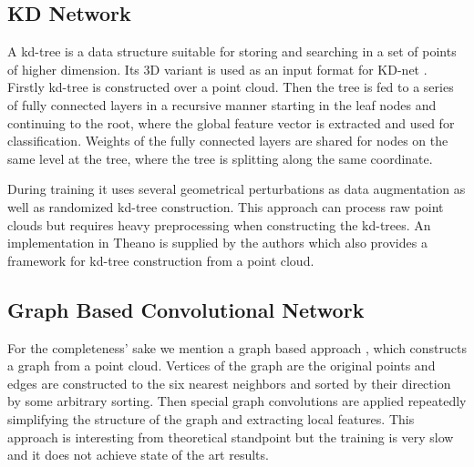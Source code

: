\subsection{KD Network}
A kd-tree \cite{bentley_multidimensional_1975} is a data structure suitable for storing and searching in a set of points of higher dimension. Its 3D variant is used as an input format for KD-net \cite{klokov_escape_2017}. Firstly kd-tree is constructed over a point cloud. Then the tree is fed to a series of fully connected layers in a recursive manner starting in the leaf nodes and continuing to the root, where the global feature vector is extracted and used for classification. Weights of the fully connected layers are shared for nodes on the same level at the tree, where the tree is splitting along the same coordinate. \par
During training it uses several geometrical perturbations as data augmentation as well as randomized kd-tree construction. This approach can process raw point clouds but requires heavy preprocessing when constructing the kd-trees.
An implementation in Theano is supplied by the authors which also provides a framework for kd-tree construction from a point cloud.

\subsection{Graph Based Convolutional Network}
For the completeness’ sake we mention a graph based approach \cite{dominguez_general-purpose_2018}, which constructs a graph from a point cloud. Vertices of the graph are the original points and edges are constructed to the six nearest neighbors and sorted by their direction by some arbitrary sorting. Then special graph convolutions are applied repeatedly simplifying the structure of the graph and extracting local features. This approach is interesting from theoretical standpoint but the training is very slow and it does not achieve state of the art results.



